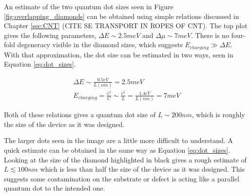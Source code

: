 An estimate of the two quantum dot sizes seen in Figure \ref{fig:overlapping_diamonds} can be obtained using simple relations discussed in Chapter \ref{sec:CNT} (CITE SE TRANSPORT IN ROPES OF CNT). The top plot gives the following parameters, $\Delta E \sim 2.5meV$ and $\Delta \mu \sim 7meV$. There is no four-fold degeneracy visible in the diamond sizes, which suggests $E_{charging} \gg \Delta E$. With that approximation, the dot size can be estimated in two ways, seen in Equation \ref{eq:dot_sizes}.

\begin{align}
    \Delta E \sim \frac{0.5eV}{L(nm)} = 2.5meV \nonumber \\
    E_{charging} = \frac{e^2}{C} \sim \frac{e^2}{L} = \frac{1.4eV}{L(nm)} = 7meV
    \label{eq:dot_sizes}
\end{align}

Both of these relations gives a quantum dot size of $L\sim200nm$, which is roughly the size of the device as it was designed. 

The larger dots seen in the image are a little more difficult to understand. A quick estimate can be obtained in the same way as Equation \ref{eq:dot_sizes}. Looking at the size of the diamond highlighted in black gives a rough estimate of $L \lesssim 100nm$ which is less than half the size of the device as it was designed. This suggests some contamination on the substrate or defect is acting like a parallel quantum dot to the intended one.